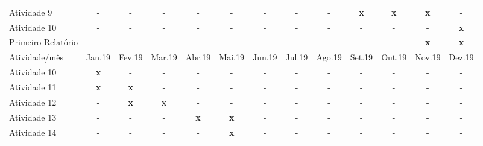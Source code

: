 \documentclass[12pt]{article}
\begin{document}
\begin{table}[ht!]
\begin{center}
{\begin{tabular}{l ccc ccc ccc ccc}
    \small Atividade 9
    & \small - & \small - & \small - & \small -  
    & \small - & \small - & \small - & \small -
    & \small {\bf x} & \small {\bf x} & \small {\bf x} & \small - \\ 
    
    
    \small Atividade 10
    & \small - & \small - & \small - & \small -  
    & \small - & \small - & \small - & \small -
    & \small - & \small - & \small - & \small {\bf x} \\ 
    
    \small Primeiro Relatório
    & \small - & \small - & \small - & \small -  
    & \small - & \small - & \small - & \small -
    & \small - & \small - & \small {\bf x} & \small {\bf x} \\ 



    \bottomrule
    \toprule
    \small Atividade/mês & \small Jan.19 & \small Fev.19 & \small Mar.19
                         & \small Abr.19 & \small Mai.19 & \small Jun.19
                         & \small Jul.19 & \small Ago.19 & \small Set.19
                         & \small Out.19 & \small Nov.19 & \small Dez.19

    \\ \hline
    
    \small Atividade 10
    & \small {\bf x} & \small - & \small - & \small -  
    & \small - & \small - & \small - & \small -
    & \small - & \small - & \small - & \small - \\ 


    \small Atividade 11 
    & \small {\bf x} & \small {\bf x} & \small - & \small -  
    & \small - & \small - & \small - & \small -
    & \small - & \small - & \small - & \small - \\ 
    
    
    \small Atividade 12
    & \small - & \small {\bf x} & \small {\bf x} & -
    & \small - & \small - & \small - & \small -
    & \small - & \small - & \small - & \small - \\ 

    \small Atividade 13
    & \small - & \small - & \small - & \small {\bf x}
    & \small {\bf x} & \small - & \small - & \small -
    & \small - & \small - & \small - & \small - \\ 

    \small Atividade 14
    & \small - & \small - & \small - & \small -  
    & \small {\bf x} & \small - & \small - & \small -
    & \small - & \small - & \small - & \small - \\ 



\end{tabular}}
\end{center}
\end{table}
\end{document}
